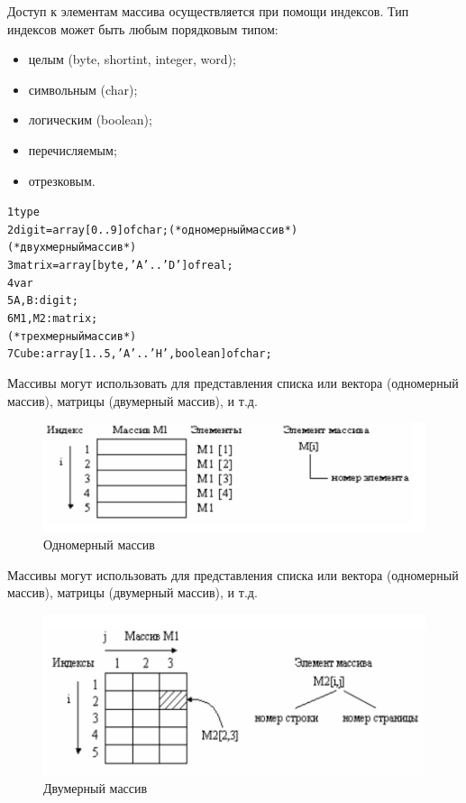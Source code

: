 \documentclass{beamer}
\begin{document}
\begin{frame}[fragile]
Доступ к элементам массива осуществляется при помощи индексов. Тип индексов может быть любым порядковым типом:
\begin{itemize}
\item целым (byte, shortint, integer, word);
\item символьным (char);
\item логическим (boolean);
\item перечисляемым;
\item отрезковым.
\end{itemize}
\begin{alltt}
1 type
2    digit = array[0..9] of char; (*одномерный массив*)
(* двухмерный массив *)
3    matrix = array[byte, 'A'..'D'] of real;  
4 var
5    A, B : digit;
6    M1, M2 : matrix; 
(* трехмерный массив *)
7    Cube : array[1..5, 'A'..'H', boolean] of char; 
\end{alltt}
\end{frame}

\begin{frame}
Массивы могут использовать для представления списка или вектора (одномерный массив), матрицы (двумерный массив), и т.д. 
\begin{figure}[h]
\centering
\includegraphics[scale=0.5]{images/one_index.png}
\caption{Одномерный массив}
\label{pic-one-index}
\end{figure}
\end{frame}

\begin{frame}
Массивы могут использовать для представления списка или вектора (одномерный массив), матрицы (двумерный массив), и т.д. 
\begin{figure}[h]
\centering
\includegraphics[scale=0.5]{images/two_index.png}
\caption{Двумерный массив}
\label{pic-two-index}
\end{figure}
\end{frame}
\end{document}
